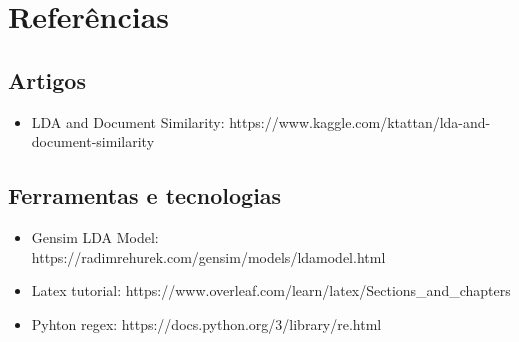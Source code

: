 \section{Referências}

\subsection{Artigos}

\begin{itemize}
    \item LDA and Document Similarity: https://www.kaggle.com/ktattan/lda-and-document-similarity
\end{itemize}

\subsection{Ferramentas e tecnologias}

\begin{itemize}
    \item Gensim LDA Model: https://radimrehurek.com/gensim/models/ldamodel.html
    \item Latex tutorial: https://www.overleaf.com/learn/latex/Sections\_and\_chapters
    \item Pyhton regex: https://docs.python.org/3/library/re.html
\end{itemize}